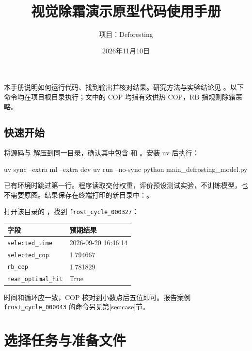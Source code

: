 \documentclass[UTF8,11pt,a4paper,fontset=fandol]{ctexart}
\title{视觉除霜演示原型代码使用手册}
\author{项目：Deforesting}
\date{2026年11月10日}
\newcommand{\code}[1]{\nolinkurl{#1}}
\begin{document}
\maketitle
本手册说明如何运行代码、找到输出并核对结果。研究方法与实验结论见 。以下命令均在项目根目录执行；文中的 COP 均指有效供热 COP，RB 指规则除霜策略。

\subsection*{快速开始}
将源码与  解压到同一目录，确认其中包含  和 。安装 uv 后执行：
\begin{Code}
uv sync --extra ml --extra dev
uv run --no-sync python main_defrosting_model.py
\end{Code}
已有环境时跳过第一行。程序读取交付权重，评价预设测试实验，不训练模型，也不需要原图。结果保存在终端打印的新目录中：。

打开该目录的 ，找到 \code{frost_cycle_000327}：
\begin{center}
\begin{tabular}{ll}
\toprule
字段 & 预期结果 \\
\midrule
\code{selected_time} & 2026-09-20 16:46:14 \\
\code{selected_cop} & 1.794667 \\
\code{rb_cop} & 1.781829 \\
\code{near_optimal_hit} & True \\
\bottomrule
\end{tabular}
\end{center}
时间和循环应一致，COP 核对到小数点后五位即可。报告案例 \code{frost_cycle_000043} 的命令另见第\ref{sec:case}节。

\section{选择任务与准备文件}
\label{sec:files}
\end{document}
